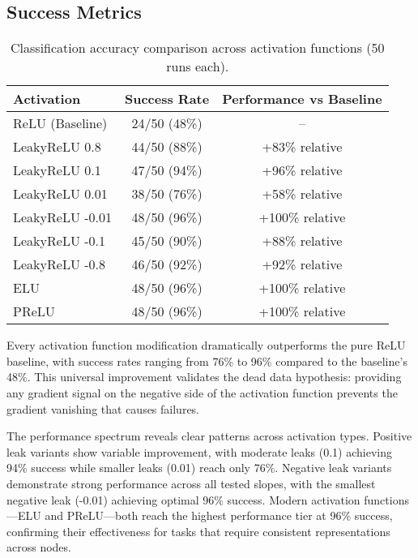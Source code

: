 
\subsection*{Success Metrics}

\begin{table}[ht]
\centering
\caption{Classification accuracy comparison across activation functions (50 runs each).}
\label{tab:relu1-activation-success}
\begin{tabular}{lcc}
\toprule
Activation & Success Rate & Performance vs Baseline \\
\midrule
ReLU (Baseline) & 24/50 (48\%) & -- \\
LeakyReLU 0.8 & 44/50 (88\%) & +83\% relative \\
LeakyReLU 0.1 & 47/50 (94\%) & +96\% relative \\
LeakyReLU 0.01 & 38/50 (76\%) & +58\% relative \\
LeakyReLU -0.01 & 48/50 (96\%) & +100\% relative \\
LeakyReLU -0.1 & 45/50 (90\%) & +88\% relative \\
LeakyReLU -0.8 & 46/50 (92\%) & +92\% relative \\
ELU & 48/50 (96\%) & +100\% relative \\
PReLU & 48/50 (96\%) & +100\% relative \\
\bottomrule
\end{tabular}
\end{table}

Every activation function modification dramatically outperforms the pure ReLU baseline, with success rates ranging from 76\% to 96\% compared to the baseline's 48\%. This universal improvement validates the dead data hypothesis: providing any gradient signal on the negative side of the activation function prevents the gradient vanishing that causes failures.

The performance spectrum reveals clear patterns across activation types. Positive leak variants show variable improvement, with moderate leaks (0.1) achieving 94\% success while smaller leaks (0.01) reach only 76\%. Negative leak variants demonstrate strong performance across all tested slopes, with the smallest negative leak (-0.01) achieving optimal 96\% success. Modern activation functions—ELU and PReLU—both reach the highest performance tier at 96\% success, confirming their effectiveness for tasks that require consistent representations across nodes.

